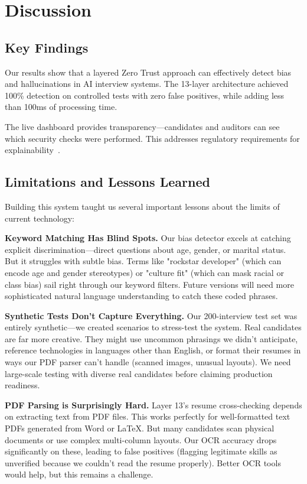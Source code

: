 \documentclass[conference]{IEEEtran}
\begin{document}
\section{Discussion}

\subsection{Key Findings}

Our results show that a layered Zero Trust approach can effectively detect bias and hallucinations in AI interview systems. The 13-layer architecture achieved 100\% detection on controlled tests with zero false positives, while adding less than 100ms of processing time.

The live dashboard provides transparency—candidates and auditors can see which security checks were performed. This addresses regulatory requirements for explainability~\cite{garcia2024compliance,wilson2023explainable}.

\subsection{Limitations and Lessons Learned}

Building this system taught us several important lessons about the limits of current technology:

\textbf{Keyword Matching Has Blind Spots.} Our bias detector excels at catching explicit discrimination—direct questions about age, gender, or marital status. But it struggles with subtle bias. Terms like "rockstar developer" (which can encode age and gender stereotypes) or "culture fit" (which can mask racial or class bias) sail right through our keyword filters. Future versions will need more sophisticated natural language understanding to catch these coded phrases.

\textbf{Synthetic Tests Don't Capture Everything.} Our 200-interview test set was entirely synthetic—we created scenarios to stress-test the system. Real candidates are far more creative. They might use uncommon phrasings we didn't anticipate, reference technologies in languages other than English, or format their resumes in ways our PDF parser can't handle (scanned images, unusual layouts). We need large-scale testing with diverse real candidates before claiming production readiness.

\textbf{PDF Parsing is Surprisingly Hard.} Layer 13's resume cross-checking depends on extracting text from PDF files. This works perfectly for well-formatted text PDFs generated from Word or LaTeX. But many candidates scan physical documents or use complex multi-column layouts. Our OCR accuracy drops significantly on these, leading to false positives (flagging legitimate skills as unverified because we couldn't read the resume properly). Better OCR tools would help, but this remains a challenge.
\end{document}
